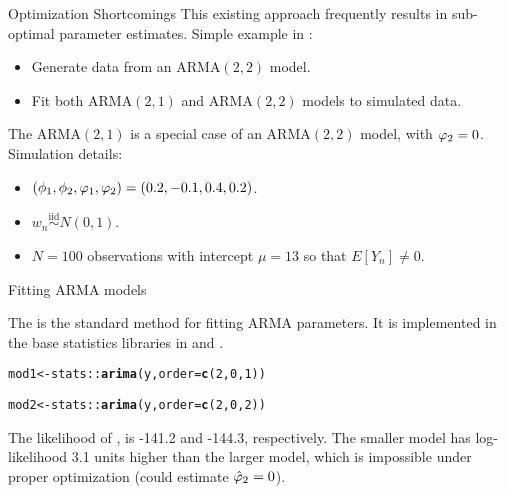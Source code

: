 \documentclass[aspectratio=169]{beamer}\usepackage[]{graphicx}\usepackage[]{xcolor}
\makeatletter
\newcommand{\hlnum}[1]{\textcolor[rgb]{0.686,0.059,0.569}{#1}}%
\newcommand{\hlopt}[1]{\textcolor[rgb]{0,0,0}{#1}}%
\newcommand{\hldef}[1]{\textcolor[rgb]{0.345,0.345,0.345}{#1}}%
\newcommand{\hlkwb}[1]{\textcolor[rgb]{0.69,0.353,0.396}{#1}}%
\newcommand{\hlkwc}[1]{\textcolor[rgb]{0.333,0.667,0.333}{#1}}%
\newcommand{\hlkwd}[1]{\textcolor[rgb]{0.737,0.353,0.396}{\textbf{#1}}}%
\newenvironment{kframe}{%
 \def\at@end@of@kframe{}%
 \ifinner\ifhmode%
  \def\at@end@of@kframe{\end{minipage}}%
  \begin{minipage}{\columnwidth}%
 \fi\fi%
 \def\FrameCommand##1{\hskip\@totalleftmargin \hskip-\fboxsep
 \colorbox{shadecolor}{##1}\hskip-\fboxsep
     \hskip-\linewidth \hskip-\@totalleftmargin \hskip\columnwidth}%
 \MakeFramed {\advance\hsize-\width
   \@totalleftmargin\z@ \linewidth\hsize
   \@setminipage}}%
 {\par\unskip\endMakeFramed%
 \at@end@of@kframe}
\newenvironment{knitrout}{}{} %
\makeatother
\begin{document}
\begin{frame}{Optimization Shortcomings}
This existing approach frequently results in sub-optimal parameter estimates. Simple example in : 
\begin{itemize}
  \item Generate data from an $\mathrm{ARMA}(2, 2)$ model.
  \item Fit both $\mathrm{ARMA}(2, 1)$ and $\mathrm{ARMA}(2, 2)$ models to simulated data.
\end{itemize}
The $\mathrm{ARMA}(2, 1)$ is a special case of an $\mathrm{ARMA}(2, 2)$ model, with $\varphi_2 = 0$. \pause
Simulation details: 
\begin{itemize}
  \item $(\phi_1, \phi_2, \varphi_1, \varphi_2) = (0.2, -0.1, 0.4, 0.2)$.
  \item $w_n \overset{\text{iid}}{\sim} N(0, 1)$. 
  \item $N = 100$ observations with intercept $\mu = 13$ so that $E[Y_n] \neq 0$.
\end{itemize}



\end{frame}

\begin{frame}{Fitting ARMA models}

The \citet{gardner1980} is the standard method for fitting $\mathrm{ARMA}$ parameters. 
It is implemented in the base statistics libraries in  and .

\begin{knitrout}
\color{fgcolor}\begin{kframe}
\begin{alltt}
\hldef{mod1} \hlkwb{<-} \hldef{stats}\hlopt{::}\hlkwd{arima}\hldef{(y,} \hlkwc{order} \hldef{=} \hlkwd{c}\hldef{(}\hlnum{2}\hldef{,} \hlnum{0}\hldef{,} \hlnum{1}\hldef{))}

\hldef{mod2} \hlkwb{<-} \hldef{stats}\hlopt{::}\hlkwd{arima}\hldef{(y,} \hlkwc{order} \hldef{=} \hlkwd{c}\hldef{(}\hlnum{2}\hldef{,} \hlnum{0}\hldef{,} \hlnum{2}\hldef{))}
\end{alltt}
\end{kframe}
\end{knitrout}

\pause 
The likelihood of ,  is -141.2 and -144.3, respectively. The \alert{smaller} model has log-likelihood 3.1 units \alert{higher} than the larger model, which is impossible under proper optimization (could estimate $\hat{\varphi}_2 = 0$).
\end{frame}
\end{document}

